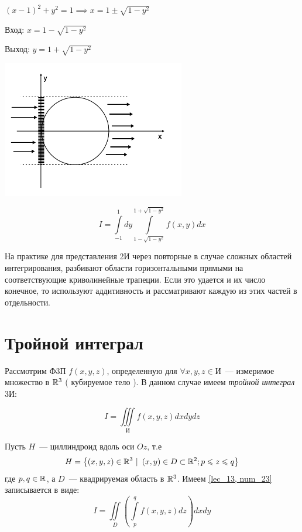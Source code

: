 \documentclass[../../main.tex]{subfiles}
\begin{document}
\begin{exmp}
\begin{enumerate}
		$ \left( x - 1 \right)^2 + y^2 = 1 \implies x = 1 \pm \sqrt{1 - y^2} $
		
		Вход: $ x = 1 - \sqrt{1 - y^2 }$
		
		Выход: $ y = 1 + \sqrt{1 - y^2 } $
		
		\begin{center}
			\includegraphics[width=0.6\textwidth]{lec13_circle_case2.png}
		\end{center}
		
		\[ I = \int\limits_{-1}^1 dy \int\limits_{1 - \sqrt{1 - y^2}} ^ 
		{1 + \sqrt{1 - y^2}} f \left( x, y\right) dx \]
	\end{enumerate}
\end{exmp}

На практике для представления 2И через повторные в случае
сложных областей интегрирования, разбивают области горизонтальными
прямыми на соответствующие криволинейные трапеции. Если это удается
и их число конечное, то используют аддитивность и рассматривают
каждую из этих частей в отдельности.

\section{Тройной интеграл }

Рассмотрим Ф3П $ f \left( x, y, z \right)$, определенную для 
$\forall x, y, z \in \text{И} $~--- измеримое множество в $ \mathbb{R}^3 $
( кубируемое тело ). В данном случае имеем \emph{тройной интеграл} 3И:

\begin{equation}
\label{lec_13, num_23}
I = \iiint\limits_{ \text{И} } f \left( x, y, z \right) dx dy dz
\end{equation}

\begin{thm}
	Пусть $ H $~--- циллиндроид вдоль оси $ Oz $, т.е 
	\begin{equation}
	\label{lec_13, num_24}
	H = \left\lbrace \left( x, y, z \right) \in \mathbb{R}^3\ |
	\ \left( x, y \right) \in D \subset \mathbb{R}^2; p \leqslant z \leqslant q \right\rbrace
	\end{equation}
	где $ p, q \in \mathbb{R} $, а $ D $~--- квадрируемая область в $ \mathbb{R}^3 $.
	Имеем \eqref {lec_13, num_23} записывается в виде:
	\begin{equation}
	\label{lec_13, num_25}
	I = \iint\limits_D \left( \int\limits_p^q f \left( x, y, z \right) dz \right) dx dy
	\end{equation}
\end{thm}
\end{document}

